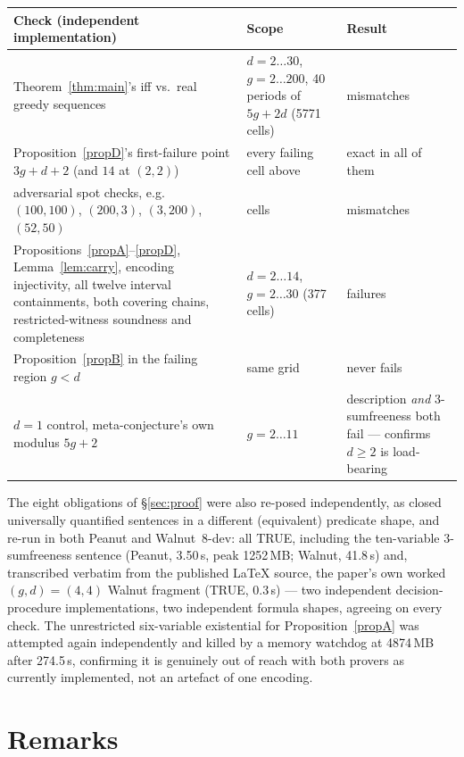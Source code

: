 \documentclass[10pt,reqno]{amsart}
\theoremstyle{plain}
\theoremstyle{definition}
\theoremstyle{remark}
\numberwithin{theorem}{section}
\begin{document}
\begin{center}\footnotesize
\begin{tabular}{@{}>{\raggedright\arraybackslash}p{6.3cm}>{\raggedright\arraybackslash}p{5.6cm}>{\raggedright\arraybackslash}p{3.3cm}@{}}
\toprule
Check (independent implementation) & Scope & Result \\
\midrule
Theorem~\ref{thm:main}'s iff vs.\ real greedy sequences
  & $d=2\dots30$, $g=2\dots200$, 40 periods of $5g+2d$ (5771 cells)
  & 0 mismatches \\
Proposition~\ref{propD}'s first-failure point $3g+d+2$ (and $14$ at $(2,2)$)
  & every failing cell above
  & exact in all of them \\
adversarial spot checks, e.g.\ $(100,100)$, $(200,3)$, $(3,200)$, $(52,50)$
  & 11 cells
  & 0 mismatches \\
Propositions~\ref{propA}--\ref{propD}, Lemma~\ref{lem:carry}, encoding injectivity, all
  twelve interval containments, both covering chains, restricted-witness soundness and
  completeness
  & $d=2\dots14$, $g=2\dots30$ (377 cells)
  & 0 failures \\
Proposition~\ref{propB} in the failing region $g<d$
  & same grid
  & never fails \\
$d=1$ control, meta-conjecture's own modulus $5g+2$
  & $g=2\dots11$
  & description \emph{and} 3-sumfreeness both fail --- confirms $d\ge2$ is load-bearing \\
\bottomrule
\end{tabular}
\end{center}

The eight obligations of \S\ref{sec:proof} were also re-posed independently, as closed
universally quantified sentences in a different (equivalent) predicate shape, and re-run in
both Peanut and Walnut~8-dev: all TRUE, including the ten-variable 3-sumfreeness sentence
(Peanut, 3.50\,s, peak 1252\,MB; Walnut, 41.8\,s) and, transcribed verbatim from the published
LaTeX source, the paper's own worked $(g,d)=(4,4)$ Walnut fragment (TRUE, 0.3\,s) --- two
independent decision-procedure implementations, two independent formula shapes, agreeing on
every check. The unrestricted six-variable existential for Proposition~\ref{propA} was
attempted again independently and killed by a memory watchdog at 4874\,MB after 274.5\,s,
confirming it is genuinely out of reach with both provers as currently implemented, not an
artefact of one encoding.

\section{Remarks}
\label{sec:remarks}
\end{document}
